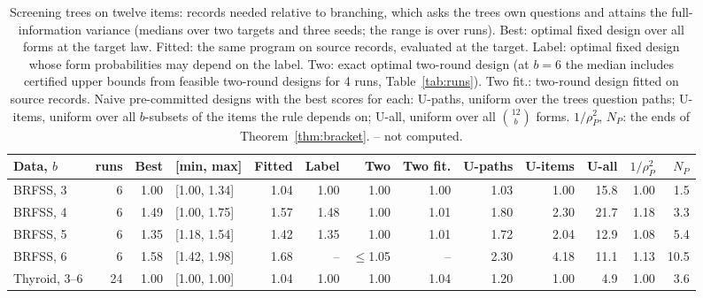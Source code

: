 \begin{table}[t]
\centering
\caption{Screening trees on twelve items: records needed relative to branching, which asks the tree\textquotesingle s own questions and attains the full-information variance (medians over two targets and three seeds; the range is over runs). Best: optimal fixed design over all forms at the target law. Fitted: the same program on source records, evaluated at the target. Label: optimal fixed design whose form probabilities may depend on the label. Two: exact optimal two-round design (at $b=6$ the median includes certified upper bounds from feasible two-round designs for 4 runs, Table~\ref{tab:runs}). Two fit.: two-round design fitted on source records. Naive pre-committed designs with the best scores for each: U-paths, uniform over the tree\textquotesingle s question paths; U-items, uniform over all $b$-subsets of the items the rule depends on; U-all, uniform over all $\binom{12}b$ forms. $1/\rho_P^2$, $N_P$: the ends of Theorem~\ref{thm:bracket}. -- not computed.}
\label{tab:screening}
\footnotesize
\setlength{\tabcolsep}{4.6pt}
\begin{tabular}{lrrlrrrrrrrrr}
\toprule
Data, $b$ & runs & Best & [min, max] & Fitted & Label & Two & Two fit. & U-paths & U-items & U-all & $1/\rho_P^2$ & $N_P$ \\
\midrule
BRFSS, 3 & 6 & 1.00 & [1.00, 1.34] & 1.04 & 1.00 & 1.00 & 1.00 & 1.03 & 1.00 & 15.8 & 1.00 & 1.5 \\
BRFSS, 4 & 6 & 1.49 & [1.00, 1.75] & 1.57 & 1.48 & 1.00 & 1.01 & 1.80 & 2.30 & 21.7 & 1.18 & 3.3 \\
BRFSS, 5 & 6 & 1.35 & [1.18, 1.54] & 1.42 & 1.35 & 1.00 & 1.01 & 1.72 & 2.04 & 12.9 & 1.08 & 5.4 \\
BRFSS, 6 & 6 & 1.58 & [1.42, 1.98] & 1.68 & -- & $\le$1.05 & -- & 2.30 & 4.18 & 11.1 & 1.13 & 10.5 \\
Thyroid, 3--6 & 24 & 1.00 & [1.00, 1.00] & 1.04 & 1.00 & 1.00 & 1.04 & 1.20 & 1.00 & 4.9 & 1.00 & 3.6 \\
\bottomrule
\end{tabular}
\end{table}
